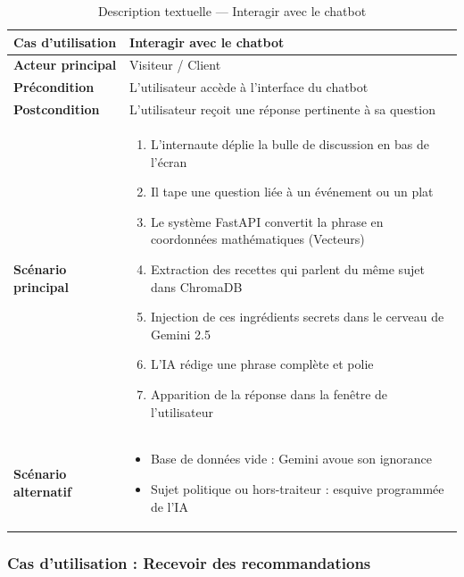 \begin{table}[H]
    \centering
    \caption{Description textuelle --- Interagir avec le chatbot}
    \label{tab:desc_chatbot}
    \renewcommand{\arraystretch}{1.3}
    \begin{tabular}{|p{4cm}|p{8.5cm}|}
        \hline
        \textbf{Cas d'utilisation} & Interagir avec le chatbot \\
        \hline
        \textbf{Acteur principal} & Visiteur / Client \\
        \hline
        \textbf{Précondition} & L'utilisateur accède à l'interface du chatbot \\
        \hline
        \textbf{Postcondition} & L'utilisateur reçoit une réponse pertinente à sa question \\
        \hline
        \textbf{Scénario principal} &
        \begin{enumerate}
            \item L'internaute déplie la bulle de discussion en bas de l'écran
            \item Il tape une question liée à un événement ou un plat
            \item Le système FastAPI convertit la phrase en coordonnées mathématiques (Vecteurs)
            \item Extraction des recettes qui parlent du même sujet dans ChromaDB
            \item Injection de ces ingrédients secrets dans le cerveau de Gemini 2.5
            \item L'IA rédige une phrase complète et polie
            \item Apparition de la réponse dans la fenêtre de l'utilisateur
        \end{enumerate} \\
        \hline
        \textbf{Scénario alternatif} &
        \begin{itemize}
            \item[4a.] Base de données vide : Gemini avoue son ignorance
            \item[6a.] Sujet politique ou hors-traiteur : esquive programmée de l'IA
        \end{itemize} \\
        \hline
    \end{tabular}
\end{table}

\subsubsection{Cas d'utilisation : Recevoir des recommandations}

